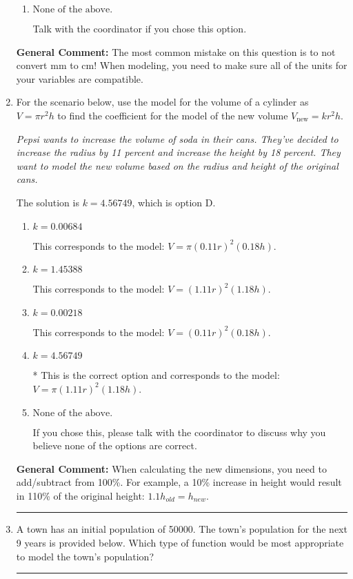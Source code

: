 \documentclass{extbook}[14pt]
\newcommand{\litem}[1]{\item #1

\rule{\textwidth}{0.4pt}}
\begin{document}
\begin{enumerate}
{\begin{enumerate}[label=\Alph*.]
This option uses the model $R = kl^{3}$ as if this is a direct variation.
\item \( \text{None of the above.} \)

Talk with the coordinator if you chose this option.
\end{enumerate}

\textbf{General Comment:} The most common mistake on this question is to not convert mm to cm! When modeling, you need to make sure all of the units for your variables are compatible.
}
\litem{
For the scenario below, use the model for the volume of a cylinder as $V = \pi r^2 h$ to find the coefficient for the model of the new volume $V_{\text{new}} = k r^2 h$.

\begin{center}
    \textit{ Pepsi wants to increase the volume of soda in their cans. They've decided to increase the radius by 11 percent and increase the height by 18 percent. They want to model the new volume based on the radius and height of the original cans. }
\end{center}
The solution is \( k = 4.56749 \), which is option D.\begin{enumerate}[label=\Alph*.]
\item \( k = 0.00684 \)

This corresponds to the model: $V = \pi (0.11 r)^2 (0.18 h)$.
\item \( k = 1.45388 \)

This corresponds to the model: $V = (1.11 r)^2 (1.18 h)$.
\item \( k = 0.00218 \)

This corresponds to the model: $V = (0.11 r)^2 (0.18 h)$.
\item \( k = 4.56749 \)

* This is the correct option and corresponds to the model: $V = \pi (1.11 r)^2 (1.18 h)$.
\item \( \text{None of the above.} \)

If you chose this, please talk with the coordinator to discuss why you believe none of the options are correct.
\end{enumerate}

\textbf{General Comment:} When calculating the new dimensions, you need to add/subtract from 100\%. For example, a 10\% increase in height would result in 110\% of the original height: $1.1h_{old} = h_{new}$.
}
\litem{
A town has an initial population of 50000. The town's population for the next 9 years is provided below. Which type of function would be most appropriate to model the town's population?


}
\end{enumerate}
\end{document}
